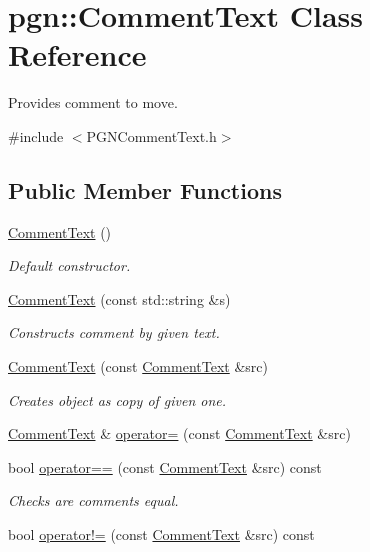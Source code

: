 \hypertarget{classpgn_1_1CommentText}{
\section{pgn::CommentText Class Reference}
\label{classpgn_1_1CommentText}
}


Provides comment to move.  




{\ttfamily \#include $<$PGNCommentText.h$>$}

\subsection*{Public Member Functions}
\begin{DoxyCompactItemize}
\item 
\hypertarget{classpgn_1_1CommentText_a8f1a46577b31547ef030208fd2c84be4}{
\hyperlink{classpgn_1_1CommentText_a8f1a46577b31547ef030208fd2c84be4}{CommentText} ()}
\label{classpgn_1_1CommentText_a8f1a46577b31547ef030208fd2c84be4}

\begin{DoxyCompactList}\small\item\em Default constructor. \item\end{DoxyCompactList}\item 
\hyperlink{classpgn_1_1CommentText_a53d4b5bac4f38b967d8b69837a43eca8}{CommentText} (const std::string \&s)
\begin{DoxyCompactList}\small\item\em Constructs comment by given text. \item\end{DoxyCompactList}\item 
\hyperlink{classpgn_1_1CommentText_aff77d46da40a2e120ba1c0dd0ad5d1aa}{CommentText} (const \hyperlink{classpgn_1_1CommentText}{CommentText} \&src)
\begin{DoxyCompactList}\small\item\em Creates object as copy of given one. \item\end{DoxyCompactList}\item 
\hyperlink{classpgn_1_1CommentText}{CommentText} \& \hyperlink{classpgn_1_1CommentText_ae6958b17db6837b177d32df85d6b0544}{operator=} (const \hyperlink{classpgn_1_1CommentText}{CommentText} \&src)
\item 
bool \hyperlink{classpgn_1_1CommentText_abb2ec8a7df892d89b673411b70950eb4}{operator==} (const \hyperlink{classpgn_1_1CommentText}{CommentText} \&src) const 
\begin{DoxyCompactList}\small\item\em Checks are comments equal. \item\end{DoxyCompactList}\item 
\hypertarget{classpgn_1_1CommentText_a8095c335ece11aa0cb4aadd3e7028f6e}{
bool \hyperlink{classpgn_1_1CommentText_a8095c335ece11aa0cb4aadd3e7028f6e}{operator!=} (const \hyperlink{classpgn_1_1CommentText}{CommentText} \&src) const }
\label{classpgn_1_1CommentText_a8095c335ece11aa0cb4aadd3e7028f6e}


\end{DoxyCompactItemize}
